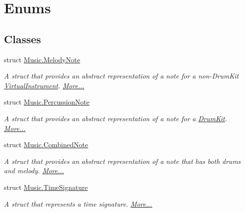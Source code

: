 \hypertarget{group___enums}{}\section{Enums}
\label{group___enums}
\subsection*{Classes}
\begin{DoxyCompactItemize}
\item 
struct \hyperlink{group___enums_struct_music_1_1_melody_note}{Music.\+Melody\+Note}
\begin{DoxyCompactList}\small\item\em A struct that provides an abstract representation of a note for a non-\/\+Drum\+Kit \hyperlink{group___audio_management_class_virtual_instrument}{Virtual\+Instrument}.  \hyperlink{group___enums_struct_music_1_1_melody_note}{More...}\end{DoxyCompactList}\item 
struct \hyperlink{group___enums_struct_music_1_1_percussion_note}{Music.\+Percussion\+Note}
\begin{DoxyCompactList}\small\item\em A struct that provides an abstract representation of a note for a \hyperlink{class_drum_kit}{Drum\+Kit}.  \hyperlink{group___enums_struct_music_1_1_percussion_note}{More...}\end{DoxyCompactList}\item 
struct \hyperlink{group___enums_struct_music_1_1_combined_note}{Music.\+Combined\+Note}
\begin{DoxyCompactList}\small\item\em A struct that provides an abstract representation of a note that has both drums and melody.  \hyperlink{group___enums_struct_music_1_1_combined_note}{More...}\end{DoxyCompactList}\item 
struct \hyperlink{group___enums_struct_music_1_1_time_signature}{Music.\+Time\+Signature}
\begin{DoxyCompactList}\small\item\em A struct that represents a time signature.  \hyperlink{group___enums_struct_music_1_1_time_signature}{More...}\end{DoxyCompactList}\end{DoxyCompactItemize}
